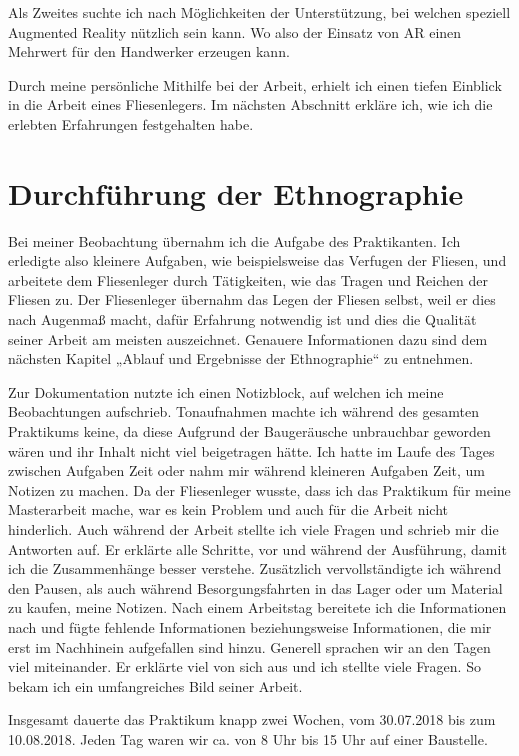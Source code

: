 Als Zweites suchte ich nach Möglichkeiten der Unterstützung, bei welchen speziell Augmented Reality nützlich sein kann. Wo also der Einsatz von AR einen Mehrwert für den Handwerker erzeugen kann.

Durch meine persönliche Mithilfe bei der Arbeit, erhielt ich einen tiefen Einblick in die Arbeit eines Fliesenlegers. Im nächsten Abschnitt erkläre ich, wie ich die erlebten Erfahrungen festgehalten habe.

\section{Durchführung der Ethnographie}

Bei meiner Beobachtung übernahm ich die Aufgabe des Praktikanten. Ich erledigte also kleinere Aufgaben, wie beispielsweise das Verfugen der Fliesen, und arbeitete dem Fliesenleger durch Tätigkeiten, wie das Tragen und Reichen der Fliesen zu. Der Fliesenleger übernahm das Legen der Fliesen selbst, weil er dies nach Augenmaß macht, dafür Erfahrung notwendig ist und dies die Qualität seiner Arbeit am meisten auszeichnet. Genauere Informationen dazu sind dem nächsten Kapitel „Ablauf und Ergebnisse der Ethnographie“ zu entnehmen.

Zur Dokumentation nutzte ich einen Notizblock, auf welchen ich meine Beobachtungen aufschrieb. Tonaufnahmen machte ich während des gesamten Praktikums keine, da diese Aufgrund der Baugeräusche unbrauchbar geworden wären und ihr Inhalt nicht viel beigetragen hätte. Ich hatte im Laufe des Tages zwischen Aufgaben Zeit oder nahm mir während kleineren Aufgaben Zeit, um Notizen zu machen. Da der Fliesenleger wusste, dass ich das Praktikum für meine Masterarbeit mache, war es kein Problem und auch für die Arbeit nicht hinderlich. Auch während der Arbeit stellte ich viele Fragen und schrieb mir die Antworten auf. Er erklärte alle Schritte, vor und während der Ausführung, damit ich die Zusammenhänge besser verstehe. Zusätzlich vervollständigte ich während den Pausen, als auch während Besorgungsfahrten in das Lager oder um Material zu kaufen, meine Notizen. Nach einem Arbeitstag bereitete ich die Informationen nach und fügte fehlende Informationen beziehungsweise Informationen, die mir erst im Nachhinein aufgefallen sind hinzu. Generell sprachen wir an den Tagen viel miteinander. Er erklärte viel von sich aus und ich stellte viele Fragen. So bekam ich ein umfangreiches Bild seiner Arbeit.

Insgesamt dauerte das Praktikum knapp zwei Wochen, vom 30.07.2018 bis zum 10.08.2018. Jeden Tag waren wir ca. von 8 Uhr bis 15 Uhr auf einer Baustelle.

